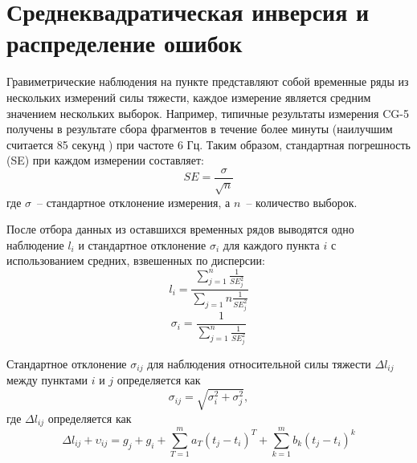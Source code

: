 \chapter[Среднеквадратическая инверсия и распределение ошибок]{Среднеквадратическая инверсия и распределение ошибок}
\label{chap:least-square_inversion_and_error_propagation}

Гравиметрические наблюдения на пункте представляют собой временные ряды из
нескольких измерений силы тяжести, каждое измерение является средним значением
нескольких выборок. Например, типичные результаты измерения CG-5 получены в
результате сбора фрагментов в течение более минуты (наилучшим считается 85
секунд \cite{merlet_micro-gravity_2008}) при частоте 6 Гц. Таким образом,
стандартная погрешность (SE) при каждом измерении составляет:
\begin{equation}
    SE = \frac{\sigma}{\sqrt{n}}
\end{equation}
где $\sigma$~-- стандартное отклонение измерения, а $n$~-- количество выборок.

После отбора данных из оставшихся временных рядов выводятся одно наблюдение $l_i$
и стандартное отклонение $\sigma_i$ для каждого пункта $i$ с использованием средних,
взвешенных по дисперсии:
\begin{equation}
    l_i = \frac{\sum_{j=1}^{n}\frac{1}{SE^2_j}}{\sum_{j=1}{n}\frac{1}{SE^2_j}}
\end{equation}
\begin{equation}
    \sigma_i = \frac{1}{\sum_{j=1}^{n}\frac{1}{SE_j^2}}
\end{equation}

Стандартное отклонение $\sigma_{ij}$ для наблюдения относительной силы тяжести
$\Delta l_{ij}$ между пунктами $i$ и $j$ определяется как
\begin{equation}
    \sigma_{ij} = \sqrt{\sigma_i^2 + \sigma_j^2},
\end{equation}
где $\Delta l_{ij}$ определяется как
\begin{equation}
    \Delta l_{ij} + \upsilon_{ij} = g_j + g_i + \sum_{T=1}^{m} a_T\left(t_j - t_i\right)^T + \sum_{k=1}^{m} b_k \left(t_j - t_i\right)^k
\end{equation}

